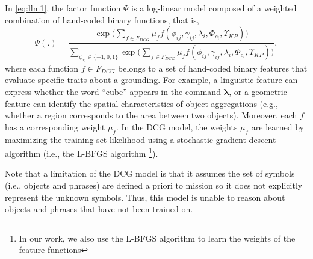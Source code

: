 In \eqref{eq:llm1}, the factor function $\Psi$ is a log-linear model composed of a weighted combination of hand-coded binary functions, that is,
\begin{equation}
\Psi(.) = \frac {\exp \Big( \sum\limits_{f \in F_{DCG}} \mu_f f(\phi_{ij},\gamma_{ij},\lambda_i,\Phi_{c_{i}},\Upsilon_{KP}) \Big)}{\sum\limits_{\phi_{ij} \in \{-1,0,1\}}\exp \Big( \sum\limits_{f \in F_{DCG}} \mu_f f(\phi_{ij},\gamma_{ij},\lambda_i,\Phi_{c_{i}},\Upsilon_{KP}) \Big)},
\label{eq:llm2}
\end{equation}
where each function $f \in F_{DCG}$ belongs to a set of hand-coded binary features that evaluate specific traits about a grounding. For example, a linguistic feature can express whether the word ``cube'' appears in the command $\boldsymbol{\lambda}$, or a geometric feature can identify the spatial characteristics of object aggregations (e.g., whether a region corresponds to the area between two objects). Moreover, each $f$ has a corresponding weight $\mu_f$. In the DCG model, the weights $\mu_f$ are learned by maximizing the training set likelihood using a stochastic gradient descent algorithm (i.e., the L-BFGS algorithm \cite{liu1989} \footnote{In our work, we also use the {L-BFGS} algorithm to learn the weights of the feature functions}). 


Note that a limitation of the DCG model is that it assumes the set of symbols (i.e., objects and phrases) are defined a priori to mission so it does not explicitly represent the unknown symbols. Thus, this model is unable to reason about objects and phrases that have not been trained on. 